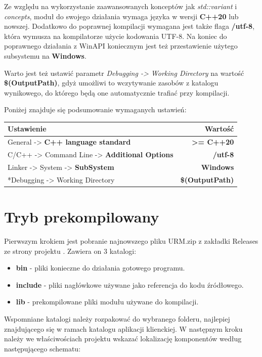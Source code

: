 Ze względu na wykorzystanie zaawansowanych konceptów jak \textit{std::variant} i \textit{concepts}, moduł do swojego działania wymaga języka w wersji \textbf{C++20} lub nowszej. Dodatkowo do poprawnej kompilacji wymagana jest także flaga \textbf{/utf-8}, która wymusza na kompilatorze użycie kodowania UTF-8. Na koniec do poprawnego działania z WinAPI koniecznym jest też przestawienie użytego subsystemu na \textbf{Windows}.

Warto jest też ustawić parametr \textit{Debugging -> Working Directory} na wartość \textbf{\$(OutputPath)}, gdyż umożliwi to wczytywanie zasobów z katalogu wynikowego, do którego będą one automatycznie trafiać przy kompilacji.

Poniżej znajduje się podsumowanie wymaganych ustawień:

\begin{center}
	\begin{tabular}{ |l r|}
		\hline
		\textbf{Ustawienie} & \textbf{Wartość} \\
		\hline
		General -> \textbf{C++ language standard}  & \textbf{>= C++20} \\
		C/C++ -> Command Line -> \textbf{Additional Options} & \textbf{/utf-8} \\
		Linker -> System -> \textbf{SubSystem} & \textbf{Windows} \\
		*Debugging -> Working Directory & \textbf{\$(OutputPath)} \\
		\hline
	\end{tabular}
\end{center}

\section*{Tryb prekompilowany}
Pierwszym krokiem jest pobranie najnowszego pliku URM.zip z zakładki Releases ze strony projektu \cite{GitHub:Minik:MasterThesisUniversalRenderingModuleD3D11}. Zawiera on 3 katalogi:

\begin{itemize}
	\item \textbf{bin} - pliki konieczne do działania gotowego programu.
	\item \textbf{include} - pliki nagłówkowe używane jako referencja do kodu źródłowego.
	\item \textbf{lib} - prekompilowane pliki modułu używane do kompilacji. 
\end{itemize}

Wspomniane katalogi należy rozpakować do wybranego folderu, najlepiej znajdującego się w ramach katalogu aplikacji klienckiej. W następnym kroku należy we właściwościach projektu wskazać lokalizację komponentów według następującego schematu:

